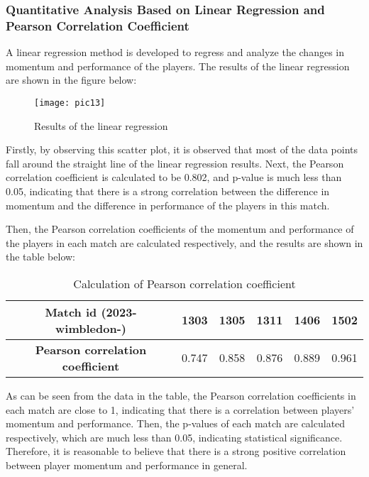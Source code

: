 \documentclass[12pt]{article}  %
\begin{document}
\subsubsection*{Quantitative Analysis Based on Linear Regression and Pearson Correlation Coefficient}
A linear regression method is developed to regress and analyze the changes in momentum and performance of the players. The results of the linear regression are shown in the figure below:

\begin{figure}[htbp]  %
	\centering  %
	\texttt{[image: pic13]} %
	\caption{Results of the linear regression}  
	\label{pic13}
\end{figure}

Firstly, by observing this scatter plot, it is observed that most of the data points fall around the straight line of the linear regression results. Next, the Pearson correlation coefficient is calculated to be 0.802, and p-value is much less than 0.05, indicating that there is a strong correlation between the difference in momentum and the difference in performance of the players in this match.

Then, the Pearson correlation coefficients of the momentum and performance of the players in each match are calculated respectively, and the results are shown in the table below:

\begin{table}[htbp]
	\centering
	\begin{tabular}{cccccc} 
		\toprule[2pt]
		\textbf{Match id} (2023-wimbledon-) & 1303  & 1305  & 1311  & 1406  & 1502   \\ 
		\midrule
		\textbf{Pearson correlation coefficient}  & 0.747 & 0.858 & 0.876 & 0.889 & 0.961  \\
		\bottomrule[2pt]
	\end{tabular}
	\caption{Calculation of Pearson correlation coefficient}
\end{table}
\vspace{-0.5cm}

As can be seen from the data in the table, the Pearson correlation coefficients in each match are close to 1, indicating that there is a correlation between players' momentum and performance. Then, the p-values of each match are calculated respectively, which are much less than 0.05, indicating statistical significance. Therefore, it is reasonable to believe that there is a strong positive correlation between player momentum and performance in general.
\end{document}
